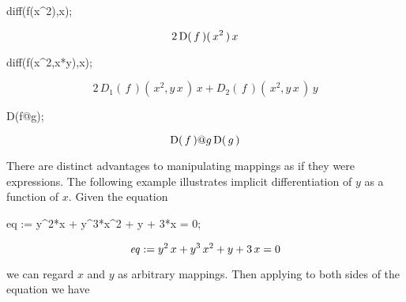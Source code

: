 \documentclass[11pt,dvips]{mtn}
\begin{document}
\begin{mapleinput}
diff(f(x^2),x);
\end{mapleinput}
\begin{maplettyout}
\end{maplettyout}
\begin{maplelatex}
\[
2\,{\rm D}(\,{f}\,)(\,{x}^{2}\,)\,{x}
\]
\end{maplelatex}
\begin{mapleinput}
diff(f(x^2,x*y),x);
\end{mapleinput}
\begin{maplettyout}
\end{maplettyout}
\begin{maplelatex}
\[
2\,{{D}_{1}}(\,{f}\,)(\,{x}^{2}, {y}\,{x}\,)\,{x} + {{D}_{2}}(\,{
f}\,)(\,{x}^{2}, {y}\,{x}\,)\,{y}
\]
\end{maplelatex}
\begin{mapleinput}
D(f@g);
\end{mapleinput}
\begin{maplettyout}
\end{maplettyout}
\begin{maplelatex}
\[
{\rm D}(\,{f}\,){\rm @}{g}\,{\rm D}(\,{g}\,)
\]
\end{maplelatex}
There are distinct advantages to manipulating mappings as if
they were expressions.  The following example illustrates implicit
differentiation of $y$ as a function of $x$.
Given the equation

\begin{mapleinput}
eq := y^2*x + y^3*x^2 + y + 3*x = 0;
\end{mapleinput}
\begin{maplelatex}
\[
{\it eq} := {y}^{2}\,{x} + {y}^{3}\,{x}^{2} + {y} + 3\,{x}=0
\]
\end{maplelatex}
we can regard $x$ and $y$ as arbitrary mappings.  Then applying
 to both sides of the equation we have
\end{document}
